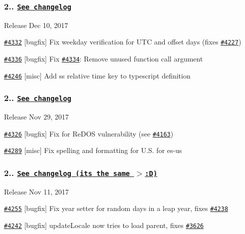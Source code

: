 \subsubsection*{2.. \href{https://gist.github.com/marwahaha/d3b7b0ddf4bdae512244f16e8cc59efb}{\tt See changelog}}


\begin{DoxyItemize}
\item Release Dec 10, 2017
\item \href{https://github.com/moment/moment/pull/4332}{\tt \#4332} \mbox{[}bugfix\mbox{]} Fix weekday verification for U\+TC and offset days (fixes \href{https://github.com/moment/moment/pull/4227}{\tt \#4227})
\item \href{https://github.com/moment/moment/pull/4336}{\tt \#4336} \mbox{[}bugfix\mbox{]} Fix \href{https://github.com/moment/moment/pull/4334}{\tt \#4334}\+: Remove unused function call argument
\item \href{https://github.com/moment/moment/pull/4246}{\tt \#4246} \mbox{[}misc\mbox{]} Add \textquotesingle{}ss\textquotesingle{} relative time key to typescript definition
\end{DoxyItemize}

\subsubsection*{2.. \href{https://gist.github.com/marwahaha/3654006bc0c2e522451c08d12c0bfabf}{\tt See changelog}}


\begin{DoxyItemize}
\item Release Nov 29, 2017
\item \href{https://github.com/moment/moment/pull/4326}{\tt \#4326} \mbox{[}bugfix\mbox{]} Fix for Re\+D\+OS vulnerability (see \href{https://github.com/moment/moment/issues/4163}{\tt \#4163})
\item \href{https://github.com/moment/moment/pull/4289}{\tt \#4289} \mbox{[}misc\mbox{]} Fix spelling and formatting for U.\+S. for es-\/us
\end{DoxyItemize}

\subsubsection*{2.. \href{https://gist.github.com/ichernev/76b1a3f33d3a8ff9665ce434a45221d0}{\tt See changelog (it\textquotesingle{}s the same $>$\+:D)}}


\begin{DoxyItemize}
\item Release Nov 11, 2017
\item \href{https://github.com/moment/moment/pull/4255}{\tt \#4255} \mbox{[}bugfix\mbox{]} Fix year setter for random days in a leap year, fixes \href{https://github.com/moment/moment/issues/4238}{\tt \#4238}
\item \href{https://github.com/moment/moment/pull/4242}{\tt \#4242} \mbox{[}bugfix\mbox{]} update\+Locale now tries to load parent, fixes \href{https://github.com/moment/moment/issues/3626}{\tt \#3626}
\end{DoxyItemize}

